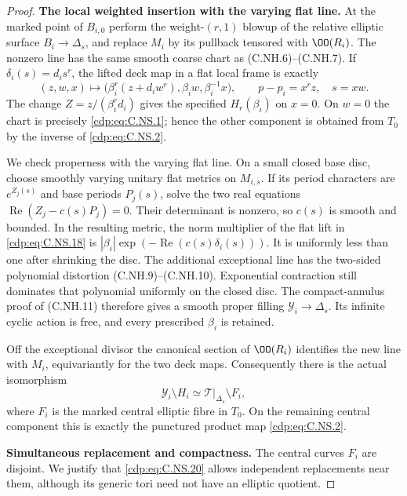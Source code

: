 \begin{proof}
\par\medskip\noindent\textbf{The local weighted insertion with the varying flat line.}
At the marked point of $B_{i,0}$ perform
the weight-$(r,1)$ blowup of the relative
elliptic surface $B_i\to\Delta_s$, and replace
$M_i$ by its pullback tensored with
$\OO(R_i)$. The nonzero line has the same
smooth coarse chart as (C.NH.6)--(C.NH.7).
If $\delta_i(s)=d_i s^r$, the lifted deck
map in a flat local frame is exactly
\[
 (z,w,x)\mapsto
   \bigl(\beta_i^r(z+d_iw^r),
              \beta_iw,\beta_i^{-1}x\bigr),
           \qquad p-p_i=x^rz,\quad s=xw.
                                                        \tag{C.NS.19}\label{cdp:eq:C.NS.19}
\]
The change $Z=z/(\beta_i^r d_i)$ gives
the specified $H_r(\beta_i)$ on $x=0$.
On $w=0$ the chart is precisely \eqref{cdp:eq:C.NS.1};
hence the other component is obtained
from $T_0$ by the inverse of \eqref{cdp:eq:C.NS.2}.

We check properness with the varying
flat line. On a small closed base disc,
choose smoothly varying unitary flat
metrics on $M_{i,s}$. If its period
characters are $e^{Z_j(s)}$ and base
periods $P_j(s)$, solve the two real
equations
$\operatorname{Re}(Z_j-c(s)P_j)=0$.
Their determinant is nonzero, so $c(s)$
is smooth and bounded. In the resulting
metric, the norm multiplier of the flat
lift in \eqref{cdp:eq:C.NS.18} is
$|\beta_i|\exp(-\operatorname{Re}(c(s)\delta_i(s)))$.
It is uniformly less than one after
shrinking the disc. The additional
exceptional line has the two-sided
polynomial distortion (C.NH.9)--(C.NH.10).
Exponential contraction still dominates
that polynomial uniformly on the closed
disc. The compact-annulus proof of
(C.NH.11) therefore gives a smooth
proper filling $\mathcal Y_i\to\Delta_s$.
Its infinite cyclic action is free,
and every prescribed $\beta_i$ is
retained.

Off the exceptional divisor the canonical
section of $\OO(R_i)$ identifies the new
line with $M_i$, equivariantly for the
two deck maps. Consequently there is
the actual isomorphism
\[
       \mathcal Y_i\setminus H_i
            \simeq \mathcal T|_{\Delta_s}\setminus F_i,
                                                        \tag{C.NS.20}\label{cdp:eq:C.NS.20}
\]
where $F_i$ is the marked central
elliptic fibre in $T_0$. On the remaining
central component this is exactly the
punctured product map \eqref{cdp:eq:C.NS.2}.

\par\medskip\noindent\textbf{Simultaneous replacement and compactness.}
The central curves $F_i$ are disjoint.
We justify that \eqref{cdp:eq:C.NS.20} allows
independent replacements near them,
although its generic tori need not
have an elliptic quotient.


\end{proof}
